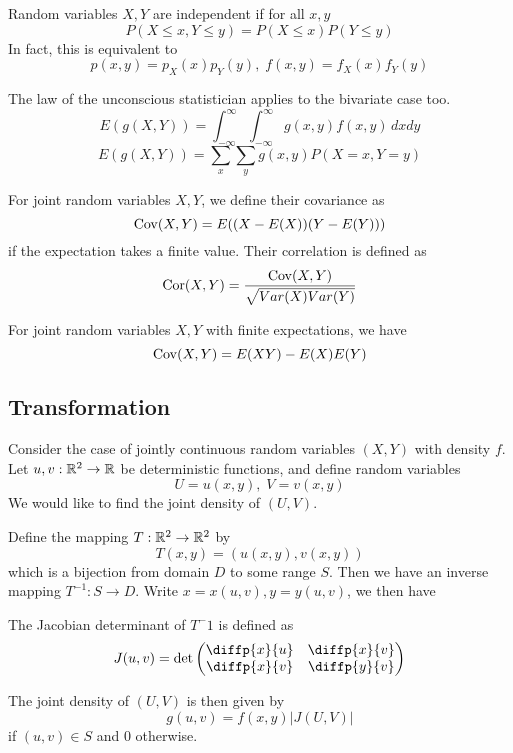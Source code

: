 \documentclass[11pt]{article}
\begin{document}
\begin{definition}[Independence]
  Random variables \(X,Y\) are independent if for all \(x,y\)
  \[P(X\leq x,Y\leq y)=P(X\leq x)P(Y\leq y)\]
  In fact, this is equivalent to
  \[p(x,y)=p_X(x)p_Y(y),\; f(x,y)=f_X(x)f_Y(y)\]
\end{definition}

\begin{theorem}[2d-LOTUS]
  The law of the unconscious statistician applies to the bivariate case too.
  \[E(g(X,Y))=\int_{-\infty}^{\infty}\int_{-\infty}^{\infty}g(x,y)f(x,y)\,dxdy\]
  \[E(g(X,Y))=\sum_x\sum_y g(x,y)P(X=x,Y=y)\]
\end{theorem}

\begin{definition}
  For joint random variables \(X,Y\), we define their covariance as
  \[\rm{Cov}(X,Y)=E((X-E(X))(Y-E(Y)))\]
  if the expectation takes a finite value. Their correlation is defined as
  \[\rm{Cor}(X,Y)=\frac{\rm{Cov}(X,Y)}{\sqrt{Var(X)Var(Y)}}\]  
\end{definition}
\begin{theorem}
  For joint random variables \(X,Y\) with finite expectations, we have
  \[\rm{Cov}(X,Y)=E(XY)-E(X)E(Y)\]
\end{theorem}

\subsection{Transformation}
Consider the case of jointly continuous random variables \((X,Y)\) with density \(f\). Let \(u,v:\R^2\to\R\) be deterministic functions, and define random variables
\[U=u(x,y),\; V=v(x,y)\]
We would like to find the joint density of \((U,V)\).

Define the mapping \(T:\R^2\to\R^2\) by 
\[T(x,y)=(u(x,y),v(x,y))\]
which is a bijection from domain \(D\) to some range \(S\). Then we have an inverse mapping \(T^{-1}:S\to D\). Write \(x=x(u,v), y=y(u,v)\), we then have 
\begin{definition}
  The Jacobian determinant of \(T^-1\) is defined as
  \[J(u,v)=\determinant\begin{pmatrix}
    \diffp{x}{u} & \diffp{x}{v} \\
    \diffp{x}{v} & \diffp{y}{v}
  \end{pmatrix}\]
\end{definition}
The joint density of \((U,V)\) is then given by
\[g(u,v)=f(x,y)|J(U,V)|\]
if \((u,v)\in S\) and 0 otherwise.
\end{document}
